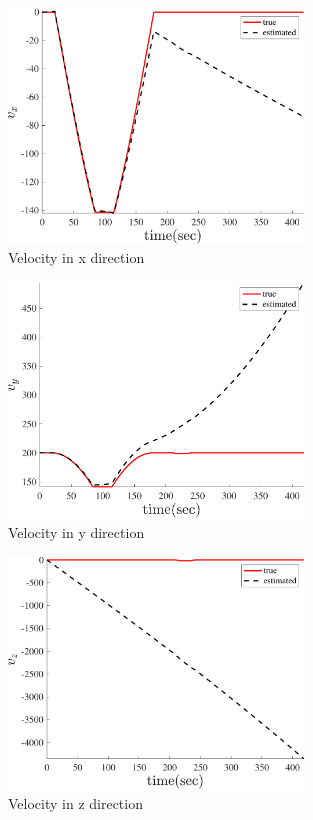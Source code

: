 \begin{figure}[H]
    \centering
    \includegraphics[width=0.7\textwidth]{../Figure/Q5/velocity_x_lin}
    \caption{Velocity in x direction}
\end{figure}
\begin{figure}[H]
    \centering
    \includegraphics[width=0.7\textwidth]{../Figure/Q5/velocity_y_lin}
    \caption{Velocity in y direction}
\end{figure}
\begin{figure}[H]
    \centering
    \includegraphics[width=0.7\textwidth]{../Figure/Q5/velocity_z_lin}
    \caption{Velocity in z direction}
\end{figure}

